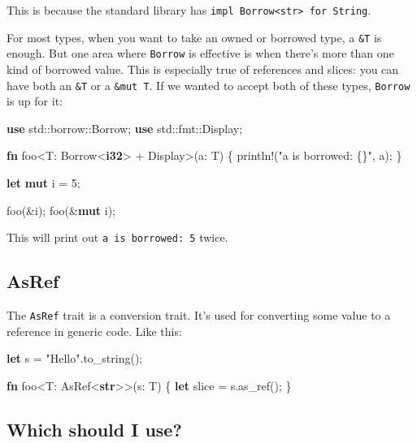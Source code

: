 \documentclass[a4paper,]{book}
\newenvironment{Shaded}{\begin{snugshade}}{\end{snugshade}}
\newcommand{\KeywordTok}[1]{\textcolor[rgb]{0.13,0.29,0.53}{\textbf{{#1}}}}
\newcommand{\DecValTok}[1]{\textcolor[rgb]{0.00,0.00,0.81}{{#1}}}
\newcommand{\StringTok}[1]{\textcolor[rgb]{0.31,0.60,0.02}{{#1}}}
\newcommand{\OtherTok}[1]{\textcolor[rgb]{0.56,0.35,0.01}{{#1}}}
\newcommand{\NormalTok}[1]{{#1}}
\begin{document}
This is because the standard library has
\texttt{impl\ Borrow\textless{}str\textgreater{}\ for\ String}.

For most types, when you want to take an owned or borrowed type, a
\texttt{\&T} is enough. But one area where \texttt{Borrow} is effective
is when there's more than one kind of borrowed value. This is especially
true of references and slices: you can have both an \texttt{\&T} or a
\texttt{\&mut\ T}. If we wanted to accept both of these types,
\texttt{Borrow} is up for it:

\begin{Shaded}
\begin{Highlighting}[]
\KeywordTok{use} \NormalTok{std::borrow::Borrow;}
\KeywordTok{use} \NormalTok{std::fmt::Display;}

\KeywordTok{fn} \NormalTok{foo<T: Borrow<}\KeywordTok{i32}\NormalTok{> + Display>(a: T) \{}
    \OtherTok{println!}\NormalTok{(}\StringTok{"a is borrowed: \{\}"}\NormalTok{, a);}
\NormalTok{\}}

\KeywordTok{let} \KeywordTok{mut} \NormalTok{i = }\DecValTok{5}\NormalTok{;}

\NormalTok{foo(&i);}
\NormalTok{foo(&}\KeywordTok{mut} \NormalTok{i);}
\end{Highlighting}
\end{Shaded}

This will print out \texttt{a\ is\ borrowed:\ 5} twice.

\subsection{AsRef}\label{asref}

The \texttt{AsRef} trait is a conversion trait. It's used for converting
some value to a reference in generic code. Like this:

\begin{Shaded}
\begin{Highlighting}[]
\KeywordTok{let} \NormalTok{s = }\StringTok{"Hello"}\NormalTok{.to_string();}

\KeywordTok{fn} \NormalTok{foo<T: AsRef<}\KeywordTok{str}\NormalTok{>>(s: T) \{}
    \KeywordTok{let} \NormalTok{slice = s.as_ref();}
\NormalTok{\}}
\end{Highlighting}
\end{Shaded}

\subsection{Which should I use?}\label{which-should-i-use}
\end{document}
